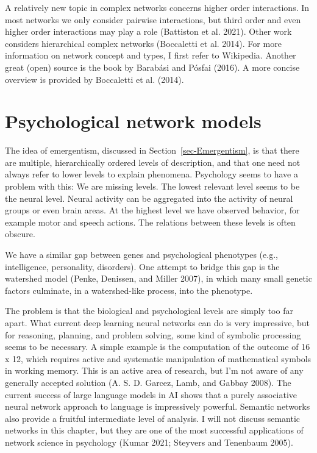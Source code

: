\documentclass[
  a4paper,
  DIV=11,
  numbers=noendperiod]{scrreprt}
\begin{document}
A relatively new topic in complex networks concerns higher order
interactions. In most networks we only consider pairwise interactions,
but third order and even higher order interactions may play a role
(Battiston et al. 2021). Other work considers hierarchical complex
networks (Boccaletti et al. 2014). For more information on network
concept and types, I first refer to Wikipedia. Another great (open)
source is the book by Barabási and Pósfai (2016). A more concise
overview is provided by Boccaletti et al. (2014).

\hypertarget{sec-Psychological-network-models}{%
\section{Psychological network
models}\label{sec-Psychological-network-models}}

The idea of emergentism, discussed in Section~\ref{sec-Emergentism}, is
that there are multiple, hierarchically ordered levels of description,
and that one need not always refer to lower levels to explain phenomena.
Psychology seems to have a problem with this: We are missing levels. The
lowest relevant level seems to be the neural level. Neural activity can
be aggregated into the activity of neural groups or even brain areas. At
the highest level we have observed behavior, for example motor and
speech actions. The relations between these levels is often obscure.

We have a similar gap between genes and psychological phenotypes (e.g.,
intelligence, personality, disorders). One attempt to bridge this gap is
the watershed model (Penke, Denissen, and Miller 2007), in which many
small genetic factors culminate, in a watershed-like process, into the
phenotype.

The problem is that the biological and psychological levels are simply
too far apart. What current deep learning neural networks can do is very
impressive, but for reasoning, planning, and problem solving, some kind
of symbolic processing seems to be necessary. A simple example is the
computation of the outcome of 16 x 12, which requires active and
systematic manipulation of mathematical symbols in working memory. This
is an active area of research, but I'm not aware of any generally
accepted solution (A. S. D. Garcez, Lamb, and Gabbay 2008). The current
success of large language models in AI shows that a purely associative
neural network approach to language is impressively powerful. Semantic
networks also provide a fruitful intermediate level of analysis. I will
not discuss semantic networks in this chapter, but they are one of the
most successful applications of network science in psychology (Kumar
2021; Steyvers and Tenenbaum 2005).
\end{document}
